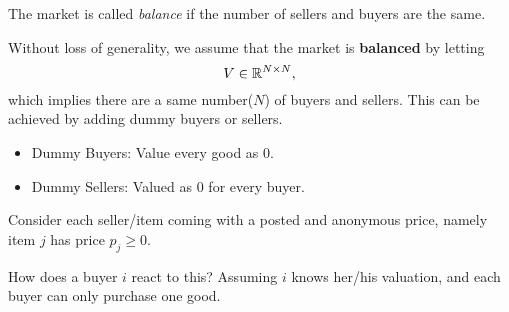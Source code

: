 \begin{definition}
	The market is called \emph{balance} if the number of sellers and buyers are the same.
\end{definition}

Without loss of generality, we assume that the market is \textbf{balanced} by letting
\[
	V\in \mathbb{\MakeUppercase{R}}^{N\times N},
\]
which implies there are a same number(\(N\)) of buyers and sellers. This can be achieved by adding dummy buyers or sellers.
\begin{itemize}
	\item Dummy Buyers: Value every good as \(0\).
	\item Dummy Sellers: Valued as \(0\) for every buyer.
\end{itemize}

Consider each seller/item coming with a posted and anonymous price, namely item \(j\) has price \(p_j\geq 0\).
\begin{problem}
How does a buyer \(i\) react to this? Assuming \(i\) knows her/his valuation, and each buyer can only purchase one good.
\end{problem}
